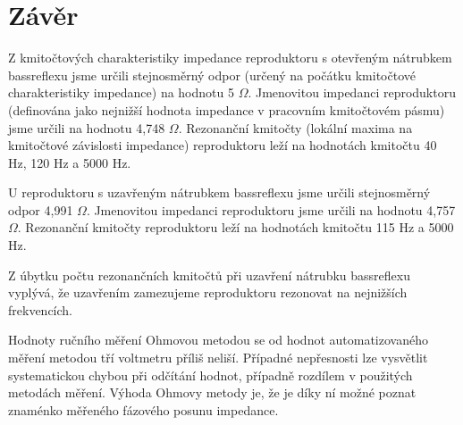 \documentclass[a4paper, czech]{article}
\begin{document}
\section{Závěr}

Z kmitočtových charakteristiky impedance reproduktoru s otevřeným nátrubkem bassreflexu jsme určili stejnosměrný odpor (určený na počátku kmitočtové charakteristiky impedance) na hodnotu 5 $\Omega$.
Jmenovitou impedanci reproduktoru (definována jako nejnižší hodnota impedance v pracovním kmitočtovém pásmu) jsme určili na hodnotu 4,748 $\Omega$.
Rezonanční kmitočty (lokální maxima na kmitočtové závislosti impedance) reproduktoru leží na hodnotách kmitočtu 40 Hz, 120 Hz a 5000 Hz.

U reproduktoru s uzavřeným nátrubkem bassreflexu jsme určili stejnosměrný odpor 4,991 $\Omega$.
Jmenovitou impedanci reproduktoru jsme určili na hodnotu 4,757 $\Omega$.
Rezonanční kmitočty reproduktoru leží na hodnotách kmitočtu  115 Hz a 5000 Hz.

Z úbytku počtu rezonančních kmitočtů při uzavření nátrubku bassreflexu vyplývá, že uzavřením zamezujeme reproduktoru rezonovat na nejnižších frekvencích.

Hodnoty ručního měření Ohmovou metodou se od hodnot automatizovaného měření metodou tří voltmetru příliš neliší.
Případné nepřesnosti lze vysvětlit systematickou chybou při odčítání hodnot, případně rozdílem v použitých metodách měření.
Výhoda Ohmovy metody je, že je díky ní možné poznat znaménko měřeného fázového posunu impedance.
\end{document}
